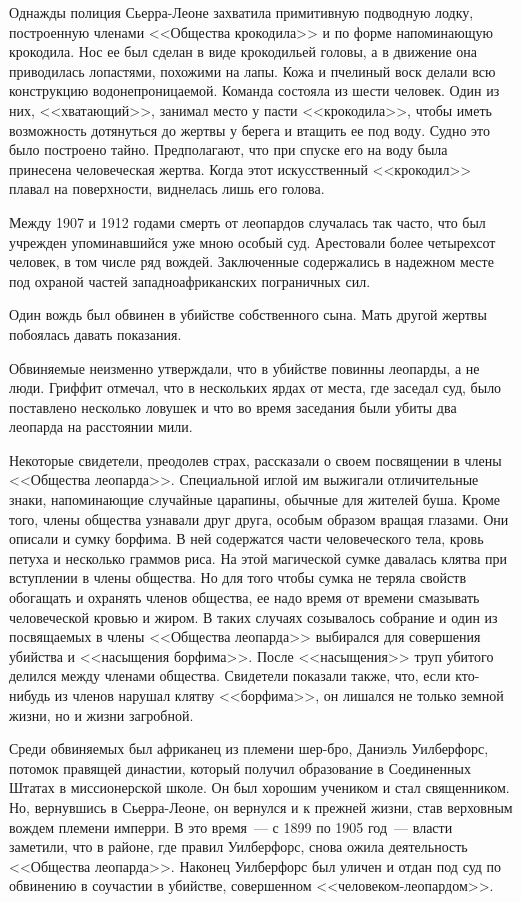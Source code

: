 \documentclass[12pt,a4paper,twoside,openany,svgnames]{memoir}
\begin{document}
Однажды полиция Сьерра-Леоне захватила примитивную подводную лодку, построенную членами <<Общества крокодила>> и по форме напоминающую крокодила. Нос ее был сделан в виде крокодильей головы, а в движение она приводилась лопастями, похожими на лапы. Кожа и пчелиный воск делали всю конструкцию водонепроницаемой. Команда состояла из шести человек. Один из них, <<хватающий>>, занимал место у пасти <<крокодила>>, чтобы иметь возможность дотянуться до жертвы у берега и втащить ее под воду. Судно это было построено тайно. Предполагают, что при спуске его на воду была принесена человеческая жертва. Когда этот искусственный <<крокодил>> плавал на поверхности, виднелась лишь его голова.

Между 1907 и 1912 годами смерть от леопардов случалась так часто, что был учрежден упоминавшийся уже мною особый суд. Арестовали более четырехсот человек, в том числе ряд вождей. Заключенные содержались в надежном месте под охраной частей западноафриканских пограничных сил.

Один вождь был обвинен в убийстве собственного сына. Мать другой жертвы побоялась давать показания.

Обвиняемые неизменно утверждали, что в убийстве повинны леопарды, а не люди. Гриффит отмечал, что в нескольких ярдах от места, где заседал суд, было поставлено несколько ловушек и что во время заседания были убиты два леопарда на расстоянии мили.

Некоторые свидетели, преодолев страх, рассказали о своем посвящении в члены <<Общества леопарда>>. Специальной иглой им выжигали отличительные знаки, напоминающие случайные царапины, обычные для жителей буша. Кроме того, члены общества узнавали друг друга, особым образом вращая глазами. Они описали и сумку борфима. В ней содержатся части человеческого тела, кровь петуха и несколько граммов риса. На этой магической сумке давалась клятва при вступлении в члены общества. Но для того чтобы сумка не теряла свойств обогащать и охранять членов общества, ее надо время от времени смазывать человеческой кровью и жиром. В таких случаях созывалось собрание и один из посвящаемых в члены <<Общества леопарда>> выбирался для совершения убийства и <<насыщения борфима>>. После <<насыщения>> труп убитого делился между членами общества. Свидетели показали также, что, если кто-нибудь из членов нарушал клятву <<борфима>>, он лишался не только земной жизни, но и жизни загробной.

Среди обвиняемых был африканец из племени шер-бро, Даниэль Уилберфорс, потомок правящей династии, который получил образование в Соединенных Штатах в миссионерской школе. Он был хорошим учеником и стал священником. Но, вернувшись в Сьерра-Леоне, он вернулся и к прежней жизни, став верховным вождем племени имперри. В это время~--- с 1899 по 1905 год~--- власти заметили, что в районе, где правил Уилберфорс, снова ожила деятельность <<Общества леопарда>>. Наконец Уилберфорс был уличен и отдан под суд по обвинению в соучастии в убийстве, совершенном <<человеком-леопардом>>.
\end{document}
